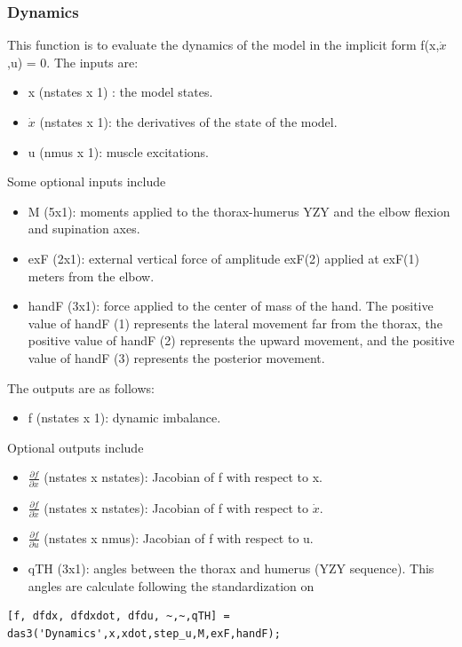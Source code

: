 \subsubsection{Dynamics}
This function is to evaluate the dynamics of the model in the implicit form f(x,$\dot{x}$,u) = 0.
The inputs are:
\begin{itemize}
    \item x (nstates x 1) : the model states.
    \item $\dot{x}$ (nstates x 1): the derivatives of the state of the model.
    \item u (nmus x 1): muscle excitations.
\end{itemize}

Some optional inputs include
\begin{itemize}
    \item M (5x1): moments applied to the thorax-humerus YZY and the elbow flexion and supination axes.
    \item exF (2x1): external vertical force of amplitude exF(2) applied at exF(1) meters from the elbow.
    \item handF (3x1): force applied to the center of mass of the hand. The positive value of handF (1) represents the lateral movement far from the thorax, the positive value of handF (2) represents the upward movement, and the positive value of handF (3) represents the posterior movement.
\end{itemize}

The outputs are as follows:

\begin{itemize}
    \item f (nstates x 1): dynamic imbalance.
\end{itemize}

Optional outputs include
\begin{itemize}
    \item $\frac{\partial f}{\partial x}$ (nstates x nstates): Jacobian of f with respect to x.
    \item $\frac{\partial f}{\partial \dot{x}}$ (nstates x nstates): Jacobian of f with respect to $\dot{x}$.
    \item $\frac{\partial f}{\partial u}$ (nstates x nmus): Jacobian of f with respect to u.
    \item qTH (3x1): angles between the thorax and humerus (YZY sequence). This angles are calculate following the standardization on \cite{ISB}
\end{itemize}
\begin{lstlisting}[style=Matlab-editor]
[f, dfdx, dfdxdot, dfdu, ~,~,qTH] = das3('Dynamics',x,xdot,step_u,M,exF,handF);
\end{lstlisting}

